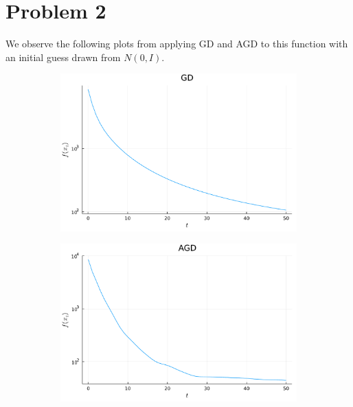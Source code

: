\documentclass{article}
\begin{document}
\section{Problem 2}
We observe the following plots from applying GD and AGD to this function with an initial guess drawn from $N(0,I)$.
\begin{figure}[H]
	\centering
	\begin{subfigure}{0.495\linewidth}
		\centering
		\includegraphics[width=\linewidth]{prob2a.pdf}
	\end{subfigure}
	\begin{subfigure}{0.495\linewidth}
		\centering
		\includegraphics[width=\linewidth]{prob2b.pdf}
	\end{subfigure}
\end{figure}
\end{document}
